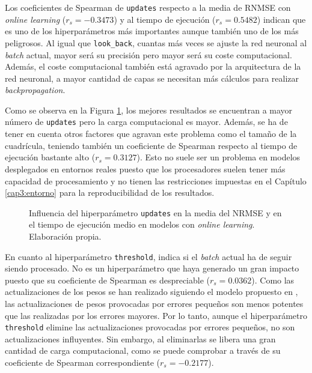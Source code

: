 Los coeficientes de Spearman de \texttt{updates} respecto a la media de RNMSE con \textit{online learning} ($r_s=-0.3473$) y al tiempo de ejecución ($r_s=0.5482$) indican que es uno de los hiperparámetros más importantes aunque también uno de los más peligrosos. Al igual que \texttt{look\_back}, cuantas más veces se ajuste la red neuronal al \textit{batch} actual, mayor será su precisión pero mayor será su coste computacional. Además, el coste computacional también está agravado por la arquitectura de la red neuronal, a mayor cantidad de capas se necesitan más cálculos para realizar \textit{backpropagation}.

Como se observa en la Figura \ref{fig:updates_nrmse_time}, los mejores resultados se encuentran a mayor número de \texttt{updates} pero la carga computacional es mayor. Además, se ha de tener en cuenta otros factores que agravan este problema como el tamaño de la cuadrícula, teniendo también un coeficiente de Spearman respecto al tiempo de ejecución bastante alto ($r_s=0.3127$). Esto no suele ser un problema en modelos desplegados en entornos reales puesto que los procesadores suelen tener más capacidad de procesamiento y no tienen las restricciones impuestas en el Capítulo \ref{cap3:entorno} para la reproducibilidad de los resultados.

\begin{figure}[h!]
	\centering
	
	\caption{Influencia del hiperparámetro \texttt{updates} en la media del NRMSE y en el tiempo de ejecución medio en modelos con \textit{online learning}. Elaboración propia.}
	\label{fig:updates_nrmse_time}
\end{figure}


En cuanto al hiperparámetro \texttt{threshold}, indica si el \textit{batch} actual ha de seguir siendo procesado. No es un hiperparámetro que haya generado un gran impacto puesto que su coeficiente de Spearman es despreciable ($r_s=0.0362$). Como las actualizaciones de los pesos se han realizado siguiendo el modelo propuesto en \cite{SKIMAcasaseca}, las actualizaciones de pesos provocadas por errores pequeños son menos potentes que las realizadas por los errores mayores. Por lo tanto, aunque el hiperparámetro \texttt{threshold} elimine las actualizaciones provocadas por errores pequeños, no son actualizaciones influyentes. Sin embargo, al eliminarlas se libera una gran cantidad de carga computacional, como se puede comprobar a través de su coeficiente de Spearman correspondiente ($r_s=-0.2177$).


